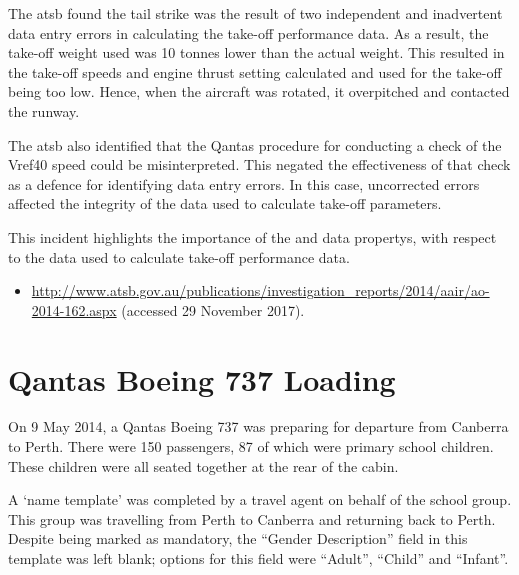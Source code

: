 The \gls{atsb} found the tail strike was the result of two independent and inadvertent data entry errors in calculating the take-off performance data. As a result, the take-off weight used was 10 tonnes lower than the actual weight. This resulted in the take-off speeds and engine thrust setting calculated and used for the take-off being too low. Hence, when the aircraft was rotated, it overpitched and contacted the runway.

The \gls{atsb} also identified that the Qantas procedure for conducting a check of the Vref40 speed could be misinterpreted. This negated the effectiveness of that check as a defence for identifying data entry errors. In this case, uncorrected errors affected the \gls{integrity} of the data used to calculate take-off parameters.

This incident highlights the importance of the  and  \glspl{data property}, with respect to the data used to calculate take-off performance data.

\begin{samepage}
\begin{itemize}
  \item \raggedright{\href{http://www.atsb.gov.au/publications/investigation_reports/2014/aair/ao-2014-162.aspx}{http://www.atsb.gov.au/publications/investigation\_reports/2014/aair/ao-2014-162.aspx} (accessed 29 November 2017).}
\end{itemize}
\end{samepage}


\section{Qantas Boeing 737 Loading} \label{bkm:incacc:qantasloading}
On 9 May 2014, a Qantas Boeing 737 was preparing for departure from Canberra to Perth. There were 150 passengers, 87 of which were primary school children. These children were all seated together at the rear of the cabin. 

A `name template' was completed by a travel agent on behalf of the school group. This group was travelling from Perth to Canberra and returning back to Perth. Despite being marked as mandatory, the ``Gender Description'' field in this template was left blank; options for this field were ``Adult'', ``Child'' and ``Infant''.

